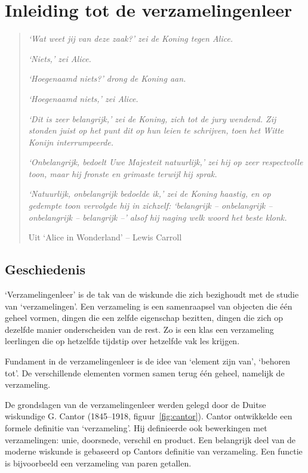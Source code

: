 %
\chapter{Inleiding tot de verzamelingenleer}
\label{chap:verzamelingenleer}
\begin{quote}
\textit{`Wat weet jij van deze zaak?' zei de Koning tegen Alice.}

\textit{`Niets,' zei Alice.}

\textit{`\emph{Hoegenaamd} niets?' drong de Koning aan.}

\textit{`Hoegenaamd niets,' zei Alice.}

\textit{`Dit is zeer belangrijk,' zei de Koning, zich tot de jury wendend. Zij stonden juist op het punt dit op hun leien te schrijven, toen het Witte Konijn interrumpeerde.}

\textit{`\emph{On}belangrijk, bedoelt Uwe Majesteit natuurlijk,' zei hij op zeer respectvolle toon, maar hij fronste en grimaste terwijl hij sprak.}

\textit{`Natuurlijk, onbelangrijk bedoelde ik,' zei de Koning haastig, en op gedempte toon vervolgde hij in zichzelf: `belangrijk -- onbelangrijk -- onbelangrijk -- belangrijk --' alsof hij naging welk woord het beste klonk.}

          Uit `Alice in Wonderland' -- Lewis Carroll
\end{quote}

\newpage
\section{Geschiedenis}
`Verzamelingenleer' is de tak van de wiskunde die zich bezighoudt met de studie van `verzamelingen'. Een verzameling is een samenraapsel van objecten die \'e\'en geheel vormen, dingen die een zelfde eigenschap bezitten, dingen die zich op dezelfde manier onderscheiden van de rest. Zo is een klas een verzameling leerlingen die op hetzelfde tijdstip over hetzelfde vak les krijgen.


Fundament in de verzamelingenleer is de idee van `element zijn van', `behoren tot'. De verschillende elementen vormen samen terug \'e\'en geheel, namelijk de verzameling.

De grondslagen van de verzamelingenleer werden gelegd door de Duitse 
wiskundige G. Cantor (1845--1918, figuur~\ref{fig:cantor}). 
Cantor ontwikkelde een formele definitie van `verzameling'. 
Hij definieerde ook bewerkingen met verzamelingen: unie, doorsnede, 
verschil en product. Een belangrijk deel van de moderne wiskunde is 
gebaseerd op Cantors definitie van verzameling.  Een functie is 
bijvoorbeeld een  verzameling van paren getallen.

